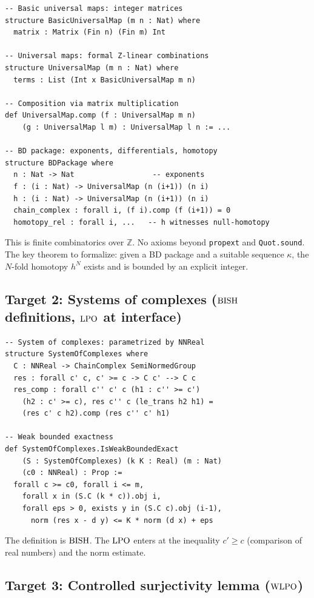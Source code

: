 \documentclass[11pt,a4paper]{article}
\theoremstyle{plain}
\theoremstyle{definition}
\newcommand{\BISH}{\textup{BISH}}
\newcommand{\WLPO}{\textup{WLPO}}
\newcommand{\LPO}{\textup{LPO}}
\newcommand{\Z}{\mathbb{Z}}
\begin{document}
\begin{verbatim}
-- Basic universal maps: integer matrices
structure BasicUniversalMap (m n : Nat) where
  matrix : Matrix (Fin n) (Fin m) Int

-- Universal maps: formal Z-linear combinations
structure UniversalMap (m n : Nat) where
  terms : List (Int x BasicUniversalMap m n)

-- Composition via matrix multiplication
def UniversalMap.comp (f : UniversalMap m n)
    (g : UniversalMap l m) : UniversalMap l n := ...

-- BD package: exponents, differentials, homotopy
structure BDPackage where
  n : Nat -> Nat                  -- exponents
  f : (i : Nat) -> UniversalMap (n (i+1)) (n i)
  h : (i : Nat) -> UniversalMap (n (i+1)) (n i)
  chain_complex : forall i, (f i).comp (f (i+1)) = 0
  homotopy_rel : forall i, ...   -- h witnesses null-homotopy
\end{verbatim}

This is finite combinatorics over $\Z$.  No axioms beyond
\texttt{propext} and \texttt{Quot.sound}.  The key theorem to
formalize: given a BD package and a suitable sequence $\kappa$,
the $N$-fold homotopy $h^N$ exists and is bounded by an explicit
integer.

\subsection{Target 2: Systems of complexes ($\BISH$ definitions, $\LPO$ at interface)}

\begin{verbatim}
-- System of complexes: parametrized by NNReal
structure SystemOfComplexes where
  C : NNReal -> ChainComplex SemiNormedGroup
  res : forall c' c, c' >= c -> C c' --> C c
  res_comp : forall c'' c' c (h1 : c'' >= c')
    (h2 : c' >= c), res c'' c (le_trans h2 h1) =
    (res c' c h2).comp (res c'' c' h1)

-- Weak bounded exactness
def SystemOfComplexes.IsWeakBoundedExact
    (S : SystemOfComplexes) (k K : Real) (m : Nat)
    (c0 : NNReal) : Prop :=
  forall c >= c0, forall i <= m,
    forall x in (S.C (k * c)).obj i,
    forall eps > 0, exists y in (S.C c).obj (i-1),
      norm (res x - d y) <= K * norm (d x) + eps
\end{verbatim}

The definition is $\BISH$.  The $\LPO$ enters at the inequality
$c' \geq c$ (comparison of real numbers) and the norm estimate.

\subsection{Target 3: Controlled surjectivity lemma ($\WLPO$)}
\end{document}
